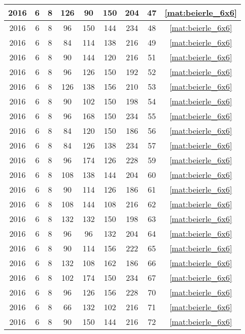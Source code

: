 \begin{longtable}{|c|c|c|c|c|c|c|c|c|}
2016 & 6 & 8 & 126 & 90 & 150 & 204 & 47 & \eqref{mat:beierle_6x6} \\ \hline 
2016 & 6 & 8 & 96 & 150 & 144 & 234 & 48 & \eqref{mat:beierle_6x6} \\ \hline 
2016 & 6 & 8 & 84 & 114 & 138 & 216 & 49 & \eqref{mat:beierle_6x6} \\ \hline 
2016 & 6 & 8 & 90 & 144 & 120 & 216 & 51 & \eqref{mat:beierle_6x6} \\ \hline 
2016 & 6 & 8 & 96 & 126 & 150 & 192 & 52 & \eqref{mat:beierle_6x6} \\ \hline 
2016 & 6 & 8 & 126 & 138 & 156 & 210 & 53 & \eqref{mat:beierle_6x6} \\ \hline 
2016 & 6 & 8 & 90 & 102 & 150 & 198 & 54 & \eqref{mat:beierle_6x6} \\ \hline 
2016 & 6 & 8 & 96 & 168 & 150 & 234 & 55 & \eqref{mat:beierle_6x6} \\ \hline 
2016 & 6 & 8 & 84 & 120 & 150 & 186 & 56 & \eqref{mat:beierle_6x6} \\ \hline 
2016 & 6 & 8 & 84 & 126 & 138 & 234 & 57 & \eqref{mat:beierle_6x6} \\ \hline 
2016 & 6 & 8 & 96 & 174 & 126 & 228 & 59 & \eqref{mat:beierle_6x6} \\ \hline 
2016 & 6 & 8 & 108 & 138 & 144 & 204 & 60 & \eqref{mat:beierle_6x6} \\ \hline 
2016 & 6 & 8 & 90 & 114 & 126 & 186 & 61 & \eqref{mat:beierle_6x6} \\ \hline 
2016 & 6 & 8 & 108 & 144 & 108 & 216 & 62 & \eqref{mat:beierle_6x6} \\ \hline 
2016 & 6 & 8 & 132 & 132 & 150 & 198 & 63 & \eqref{mat:beierle_6x6} \\ \hline 
2016 & 6 & 8 & 96 & 96 & 132 & 204 & 64 & \eqref{mat:beierle_6x6} \\ \hline 
2016 & 6 & 8 & 90 & 114 & 156 & 222 & 65 & \eqref{mat:beierle_6x6} \\ \hline 
2016 & 6 & 8 & 132 & 108 & 162 & 186 & 66 & \eqref{mat:beierle_6x6} \\ \hline 
2016 & 6 & 8 & 102 & 174 & 150 & 234 & 67 & \eqref{mat:beierle_6x6} \\ \hline 
2016 & 6 & 8 & 96 & 126 & 156 & 228 & 70 & \eqref{mat:beierle_6x6} \\ \hline 
2016 & 6 & 8 & 66 & 132 & 102 & 216 & 71 & \eqref{mat:beierle_6x6} \\ \hline 
2016 & 6 & 8 & 90 & 150 & 144 & 216 & 72 & \eqref{mat:beierle_6x6} \\ \hline 

\end{longtable}
